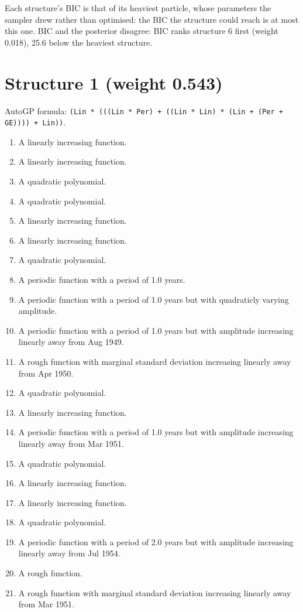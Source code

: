 \documentclass[11pt,a4paper]{article}
\begin{document}
Each structure's BIC is that of its heaviest particle, whose parameters the sampler drew rather than optimised: the BIC the structure could reach is at most this one. BIC and the posterior disagree: BIC ranks structure 6 first (weight 0.018), 25.6 below the heaviest structure.

\section*{Structure 1 (weight 0.543)}

AutoGP formula: \texttt{(Lin * (((Lin * Per) + ((Lin * Lin) * (Lin + (Per + GE)))) + Lin))}.
\begin{enumerate}
  \item A linearly increasing function.
  \item A linearly increasing function.
  \item A quadratic polynomial.
  \item A quadratic polynomial.
  \item A linearly increasing function.
  \item A linearly increasing function.
  \item A quadratic polynomial.
  \item A periodic function with a period of 1.0 years.
  \item A periodic function with a period of 1.0 years but with quadraticly varying amplitude.
  \item A periodic function with a period of 1.0 years but with amplitude increasing linearly away from Aug 1949.
  \item A rough function with marginal standard deviation increasing linearly away from Apr 1950.
  \item A quadratic polynomial.
  \item A linearly increasing function.
  \item A periodic function with a period of 1.0 years but with amplitude increasing linearly away from Mar 1951.
  \item A quadratic polynomial.
  \item A linearly increasing function.
  \item A linearly increasing function.
  \item A quadratic polynomial.
  \item A periodic function with a period of 2.0 years but with amplitude increasing linearly away from Jul 1954.
  \item A rough function.
  \item A rough function with marginal standard deviation increasing linearly away from Mar 1951.

\end{enumerate}
\end{document}
